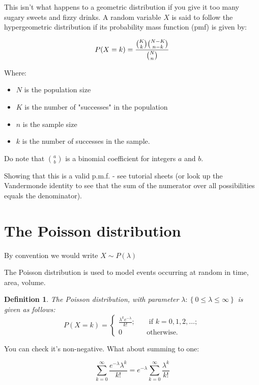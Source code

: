 \documentclass[12pt]{extbook}
\newtheorem{df}{Definition}[section]
\begin{document}
This isn't what happens to a geometric distribution if you give it too many sugary sweets and fizzy drinks.   A random variable $X$ is said to follow the hypergeometric distribution if its probability mass function (pmf) is given by:

$$P(X=k) = {{{K \choose k} {{N-K} \choose {n-k}}}\over {N \choose n}}$$

Where:
\begin{itemize}
\item    $N$ is the population size
\item $K$ is the number of "successes" in the population
\item $n$ is the sample size
\item $k$ is the number of successes in the sample.
\end{itemize}
Do note that ${a \choose b}$ is a binomial coefficient for integers $a$ and $b$.


Showing that this is a valid p.m.f. - see tutorial sheets (or look up the Vandermonde identity to see that the sum of the numerator over all possibilities equals the denominator).




\section{The Poisson distribution}

{\color{green}By convention we would write $X \sim P(\lambda)$} 

The Poisson distribution is used to model events occurring at random in time, area, volume.

\begin{df}
The Poisson distribution, with parameter $\lambda: \left\{0 \leq \lambda \leq \infty \right\}$ is given as follows:
\begin{displaymath}
P(X=k) = \left\{ \begin{array}{crr} \frac{\lambda^k e^{-\lambda}}{k!}; & & \mbox{ if } k=0,1,2,\ldots; \\ 0 & & \mbox{otherwise.} \end{array} \right.
\end{displaymath}
\end{df}



You can check it's non-negative.   What about summing to one:

\begin{displaymath}
\sum_{k=0}^{\infty} \frac{e^{-\lambda}\lambda^k}{k!} = e^{-\lambda} \sum_{k=0}^{\infty} \frac{\lambda^k}{k!}
\end{displaymath}
\end{document}
